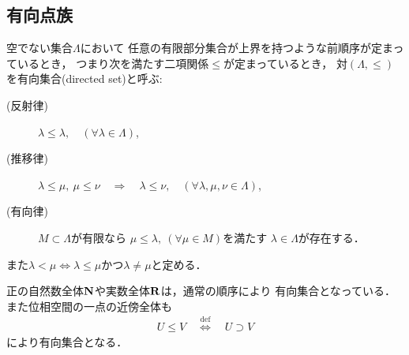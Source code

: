 \subsection{有向点族}
	\begin{screen}
		\begin{dfn}[有向集合]
			空でない集合$\Lambda$において
			任意の有限部分集合が上界を持つような前順序が定まっているとき，
			つまり次を満たす二項関係$\leq$が定まっているとき，
			対$(\Lambda,\leq)$を有向集合(directed set)と呼ぶ:
			\begin{description}
				\item[(反射律)] $\lambda \leq \lambda,\quad (\forall \lambda \in \Lambda)$,
				\item[(推移律)] $\lambda \leq \mu,\ \mu \leq \nu 
					\quad \Longrightarrow \quad \lambda \leq \nu,\quad 
					(\forall \lambda,\mu,\nu \in \Lambda)$,
				\item[(有向律)] 
					$M \subset \Lambda$が有限なら
					$\mu \leq \lambda,\ (\forall \mu \in M)$を満たす
					$\lambda \in \Lambda$が存在する．
			\end{description}
			また$\lambda < \mu \Longleftrightarrow 
			\mbox{$\lambda \leq \mu$かつ$\lambda \neq \mu$}$と定める．
		\end{dfn}
	\end{screen}
	正の自然数全体$\mathbf{N}$や実数全体$\mathbf{R}$は，通常の順序により
	有向集合となっている．また位相空間の一点の近傍全体も
	\begin{align}
		U \leq V \quad \overset{\mathrm{def}}{\Longleftrightarrow} \quad
		U \supset V
	\end{align}
	により有向集合となる．
	
